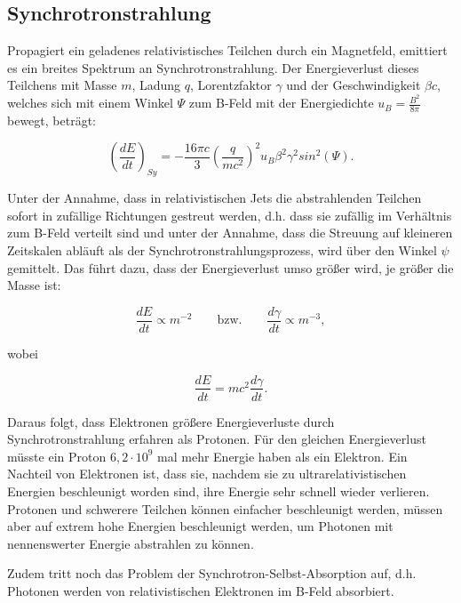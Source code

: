 \subsection{Synchrotronstrahlung}
Propagiert ein geladenes relativistisches Teilchen durch ein Magnetfeld, emittiert es ein breites Spektrum an Synchrotronstrahlung.
Der Energieverlust dieses Teilchens mit Masse $m$, Ladung $q$, Lorentzfaktor $\gamma$ und der Geschwindigkeit $\beta c$, welches sich mit einem Winkel $\Psi$ zum B-Feld mit der Energiedichte $u_B=\frac{B^2}{8\pi}$ bewegt, beträgt:

\begin{equation}
 \left( \frac{dE}{dt} \right)_{Sy} = - \frac{16 \pi c}{3} \left(\frac{q}{mc^2} \right)^2 u_B \beta^2 \gamma^2 sin^2(\Psi).
\end{equation}

Unter der Annahme, dass in relativistischen Jets die abstrahlenden Teilchen sofort in zufällige Richtungen gestreut werden, d.h. dass sie zufällig im Verhältnis zum B-Feld verteilt sind und unter der Annahme, dass die Streuung auf kleineren Zeitskalen abläuft als der Synchrotronstrahlungsprozess, wird über den Winkel $\psi$ gemittelt.
Das führt dazu, dass der Energieverlust umso größer wird, je größer die Masse ist:

\begin{equation}
 \frac{dE}{dt}\propto m^{-2} \qquad \text{bzw.} \qquad \frac{d\gamma}{dt}\propto m^{-3},
\end{equation}

wobei 

\begin{equation}
 \frac{dE}{dt} = mc^2 \frac{d\gamma}{dt}.
\end{equation}

Daraus folgt, dass Elektronen größere Energieverluste durch Synchrotronstrahlung erfahren als Protonen.
Für den gleichen Energieverlust müsste ein Proton $6,2\cdot10^9$ mal mehr Energie haben als ein Elektron.
Ein Nachteil von Elektronen ist, dass sie, nachdem sie zu ultrarelativistischen Energien beschleunigt worden sind, ihre Energie sehr schnell wieder verlieren.
Protonen und schwerere Teilchen können einfacher beschleunigt werden,  müssen aber auf extrem hohe Energien beschleunigt werden, um Photonen mit nennenswerter Energie abstrahlen zu können.

Zudem tritt noch das Problem der Synchrotron-Selbst-Absorption auf, d.h. Photonen werden von relativistischen Elektronen im B-Feld absorbiert.\cite{RelativisticJets}

